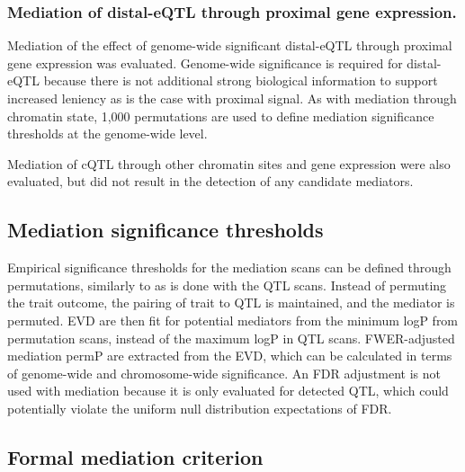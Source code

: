 \documentclass[9pt,twocolumn,twoside]{gsajnl}
\begin{document}
\subsubsection{Mediation of distal-eQTL through proximal gene expression.}
Mediation of the effect of genome-wide significant distal-eQTL through proximal gene expression was evaluated. Genome-wide significance is required for distal-eQTL because there is not additional strong biological information to support increased leniency as is the case with proximal signal. As with mediation through chromatin state, 1,000 permutations are used to define mediation significance thresholds at the genome-wide level. 

Mediation of cQTL through other chromatin sites and gene expression were also evaluated, but did not result in the detection of any candidate mediators.

\subsection{Mediation significance thresholds}

Empirical significance thresholds for the mediation scans can be defined through permutations, similarly to as is done with the QTL scans. Instead of permuting the trait outcome, the pairing of trait to QTL is maintained, and the mediator is permuted. EVD are then fit for potential mediators from the minimum logP from permutation scans, instead of the maximum logP in QTL scans. FWER-adjusted mediation permP are extracted from the EVD, which can be calculated in terms of genome-wide and chromosome-wide significance. An FDR adjustment is not used with mediation because it is only evaluated for detected QTL, which could potentially violate the uniform null distribution expectations of FDR.

\subsection{Formal mediation criterion}
\end{document}
